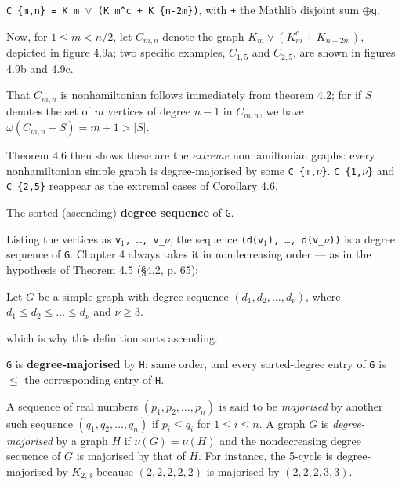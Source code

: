 \begin{definition}[$C_{m,n} = K_m \lor (K_m^c + K_{n-2m})$, with $+$ the Mathlib disjoint sum $\oplus g$]
\label{SimpleGraph.Cmn}
\leanok
{}
\texttt{C\_\{m,n\} = K\_m $\lor$ (K\_m\textasciicircum{}c + K\_\{n-2m\})}, with \texttt{+} the Mathlib disjoint sum \texttt{$\oplus$g}.

Now, for $1 \le m < n/2$, let $C_{m,n}$ denote the graph
$K_m \vee (K_m^c + K_{n-2m})$, depicted in figure 4.9a; two specific examples,
$C_{1,5}$ and $C_{2,5}$, are shown in figures 4.9b and 4.9c.

That $C_{m,n}$ is nonhamiltonian follows immediately from theorem 4.2; for if
$S$ denotes the set of $m$ vertices of degree $n-1$ in $C_{m,n}$, we have
$\omega(C_{m,n} - S) = m + 1 > |S|$.

Theorem 4.6 then shows these are the \emph{extreme} nonhamiltonian graphs: every
nonhamiltonian simple graph is degree-majorised by some \texttt{C\_\{m,$\nu$\}}.
\texttt{C\_\{1,$\nu$\}} and \texttt{C\_\{2,5\}} reappear as the extremal cases of
Corollary 4.6.
\end{definition}

\begin{definition}
\label{SimpleGraph.degreeSequence}
\leanok
The sorted (ascending) \textbf{degree sequence} of \texttt{G}.

Listing the vertices as \texttt{v$_{1}$, \dots{}, v\_$\nu$}, the sequence
\texttt{(d(v$_{1}$), \dots{}, d(v\_$\nu$))} is a degree sequence of \texttt{G}. Chapter
4 always takes it in nondecreasing order --- as in the hypothesis of Theorem 4.5
(\S{}4.2, p. 65):

Let $G$ be a simple graph with degree sequence $(d_1, d_2, \ldots, d_\nu)$,
where $d_1 \leq d_2 \leq \ldots \leq d_\nu$ and $\nu \geq 3$.

which is why this definition sorts ascending.
\end{definition}

\begin{definition}
\label{SimpleGraph.DegreeMajorised}
\leanok
{}
\texttt{G} is \textbf{degree-majorised} by \texttt{H}: same order, and every sorted-degree entry of \texttt{G}
is $\le$ the corresponding entry of \texttt{H}.

A sequence of real numbers $(p_1, p_2, \ldots, p_n)$ is said to be \emph{majorised} by
another such sequence $(q_1, q_2, \ldots, q_n)$ if $p_i \le q_i$ for $1 \le i \le n$. A
graph $G$ is \emph{degree-majorised} by a graph $H$ if $\nu(G) = \nu(H)$ and the
nondecreasing degree sequence of $G$ is majorised by that of $H$. For instance, the
5-cycle is degree-majorised by $K_{2,3}$ because $(2, 2, 2, 2, 2)$ is majorised by $(2,
2, 2, 3, 3)$.
\end{definition}


